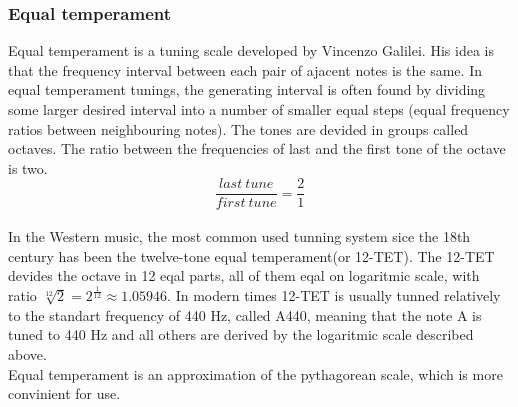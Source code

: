 \documentclass[]{article}
\begin{document}
            \subsubsection{Equal temperament}
                Equal temperament is a tuning scale developed by Vincenzo Galilei. His idea is that the frequency interval between each pair of ajacent notes is the same. In equal temperament tunings, the generating interval is often found by dividing some larger desired interval into a number of smaller equal steps (equal frequency ratios between neighbouring notes). The tones are devided in groups called octaves. The ratio between the frequencies of last and the first tone of the octave is two.
                $$\frac{last\ tune}{first\ tune} = \frac{2}{1}$$ \\
                In the Western music, the most common used tunning system sice the 18th century has been the twelve-tone equal temperament(or 12-TET). The 12-TET devides the octave in 12 eqal parts, all of them eqal on logaritmic scale, with ratio $\sqrt[12]{2} = 2^\frac{1}{12} \approx 1.05946$. In modern times 12-TET is usually tunned relatively to the standart frequency of 440 Hz, called A440, meaning that the note A is tuned to 440 Hz and all others are derived by the logaritmic scale described above. \\
                Equal temperament is an approximation of the pythagorean scale, which is more convinient for use.\\
\end{document}
